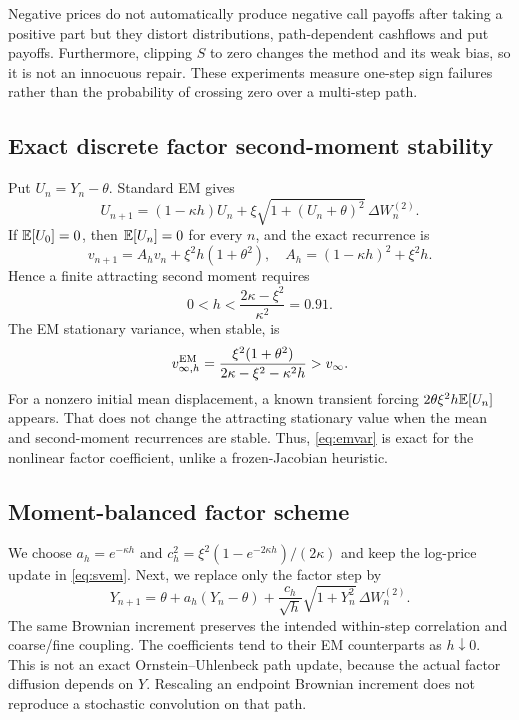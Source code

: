 Negative prices do not automatically produce negative call payoffs after taking a positive part but they distort distributions, path-dependent cashflows and put payoffs. Furthermore, clipping $S$ to zero changes the method and its weak bias, so it is not an innocuous repair. These experiments measure one-step sign failures rather than the probability of crossing zero over a multi-step path.

\subsection{Exact discrete factor second-moment stability}
Put $U_n=Y_n-\theta$. Standard EM gives
\begin{equation}U_{n+1}=(1-\kappa h)U_n+\xi\sqrt{1+(U_n+\theta)^2}\,\Delta W_n^{(2)}.
\end{equation}
If $\mathbb E[U_0]=0$, then $\mathbb E[U_n]=0$ for every $n$, and the exact recurrence is
\begin{equation}\label{eq:emvar}
v_{n+1}=A_hv_n+\xi^2h(1+\theta^2),\quad
A_h=(1-\kappa h)^2+\xi^2h.
\end{equation}
Hence a finite attracting second moment requires
\begin{equation}\label{eq:threshold}
0<h<\frac{2\kappa-\xi^2}{\kappa^2}=0.91.
\end{equation}
The EM stationary variance, when stable, is
\begin{equation}\label{eq:emstationary}
v_{\infty,h}^{\rm EM}=\frac{\xi^2(1+\theta^2)}{2\kappa-\xi^2-\kappa^2h}>v_\infty.
\end{equation}
For a nonzero initial mean displacement, a known transient forcing $2\theta\xi^2h\mathbb E[U_n]$ appears. That does not change the attracting stationary value when the mean and second-moment recurrences are stable. Thus, \eqref{eq:emvar} is exact for the nonlinear factor coefficient, unlike a frozen-Jacobian heuristic.

\subsection{Moment-balanced factor scheme}
We choose $a_h=e^{-\kappa h}$ and $c_h^2=\xi^2(1-e^{-2\kappa h})/(2\kappa)$ and keep the log-price update in \eqref{eq:svem}. Next, we replace only the factor step by
\begin{equation}\label{eq:balanced}
Y_{n+1}=\theta+a_h(Y_n-\theta)+\frac{c_h}{\sqrt h}\sqrt{1+Y_n^2}\,\Delta W_n^{(2)}.
\end{equation}
The same Brownian increment preserves the intended within-step correlation and coarse/fine coupling. The coefficients tend to their EM counterparts as $h\downarrow0$. This is not an exact Ornstein--Uhlenbeck path update, because the actual factor diffusion depends on $Y$. Rescaling an endpoint Brownian increment does not reproduce a stochastic convolution on that path.

